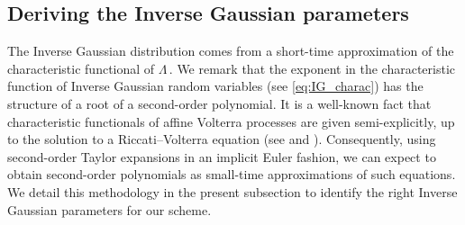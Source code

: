 \documentclass{article}
\newcommand{\1}{\mathbbm{1}}
\numberwithin{equation}{section}
\begin{document}
\subsection{Deriving the Inverse Gaussian parameters}\label{subsec:deriving_ig}
The Inverse Gaussian distribution comes from a short-time approximation of the characteristic functional of $\Lambda\,$. We remark that the exponent in the characteristic function of Inverse Gaussian random variables (see \ref{eq:IG_charac}) has the structure of a root of a second-order polynomial. It is a well-known fact that characteristic functionals of affine Volterra processes are given semi-explicitly, up to the solution to a Riccati--Volterra equation (see \citet[Theorem~2.2]{abi2021weak} and \citet*{abi2019affine}). Consequently, using second-order Taylor expansions in an implicit Euler fashion, we can expect to obtain second-order polynomials as small-time approximations of such equations. We detail this methodology in the present subsection to identify the right Inverse Gaussian parameters for our scheme.
\end{document}
